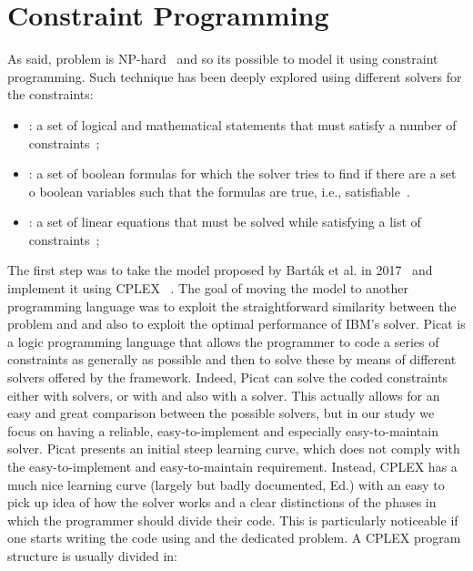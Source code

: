 \section{Constraint Programming}
As said,  problem is NP-hard~\cite{lavalle} and so its possible to
model it using constraint programming. Such technique has been deeply explored
using different solvers for the constraints:
\begin{itemize}
  \item {}: a set of logical and mathematical statements that must
    satisfy a number of constraints~\cite{CSP};
  \item {}: a set of boolean formulas for which the solver tries to
    find if there are a set o boolean variables such that the formulas are
    true, i.e., satisfiable~\cite{SATSolver}. 
  \item {}: a set of linear equations that must be solved while
    satisfying a list of constraints~\cite{MAPF_overview};
\end{itemize}
The first step was to take the model proposed by Bart\'{a}k et al. in 
2017~\cite{picat1} and implement it using CPLEX ~\cite{OPL}. The goal 
of moving the model to another programming language was to exploit the 
straightforward similarity between the problem and  and also to 
exploit the optimal performance of IBM's solver. \newline
Picat is a logic programming language that allows the programmer to code a
series of constraints as generally as possible and then to solve these by means
of different solvers offered by the framework. Indeed, Picat can solve the
coded constraints either with  solvers, or with  and also
with a  solver. This actually allows for an easy and great comparison
between the possible solvers, but in our study we focus on having a reliable,
easy-to-implement and especially easy-to-maintain solver. Picat presents an 
initial steep learning curve, which does not comply with the easy-to-implement
and easy-to-maintain requirement. \newline
Instead, CPLEX has a much nice learning curve (largely but badly documented,
Ed.) with an easy to pick up idea of how the solver works and a clear
distinctions of the phases in which the programmer should divide their code.
This is particularly noticeable if one starts writing the code using 
and the dedicated problem. A CPLEX program structure 
is usually divided in:
